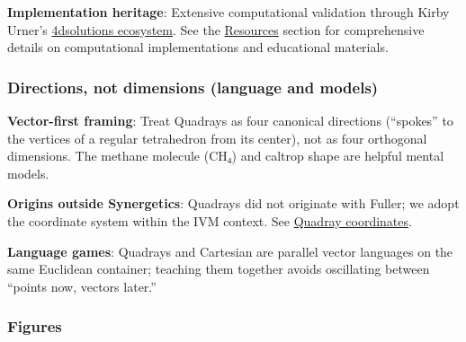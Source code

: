 \documentclass[
  10pt,
]{article}
\begin{document}
\textbf{Implementation heritage}: Extensive computational validation
through Kirby Urner's \href{https://github.com/4dsolutions}{4dsolutions
ecosystem}. See the \href{07_resources.md}{Resources} section for
comprehensive details on computational implementations and educational
materials.

\hypertarget{directions-not-dimensions-language-and-models}{%
\subsubsection{Directions, not dimensions (language and
models)}\label{directions-not-dimensions-language-and-models}}

\textbf{Vector-first framing}: Treat Quadrays as four canonical
directions (``spokes'' to the vertices of a regular tetrahedron from its
center), not as four orthogonal dimensions. The methane molecule (CH₄)
and caltrop shape are helpful mental models.

\textbf{Origins outside Synergetics}: Quadrays did not originate with
Fuller; we adopt the coordinate system within the IVM context. See
\href{https://en.wikipedia.org/wiki/Quadray_coordinates}{Quadray
coordinates}.

\textbf{Language games}: Quadrays and Cartesian are parallel vector
languages on the same Euclidean container; teaching them together avoids
oscillating between ``points now, vectors later.''

\hypertarget{figures}{%
\subsubsection{Figures}\label{figures}}
\end{document}
